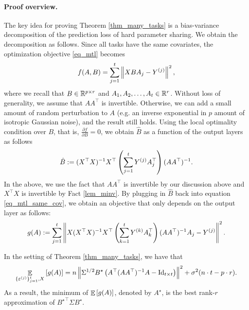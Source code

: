 	\paragraph{Proof overview.} The key idea for proving Theorem \ref{thm_many_tasks} is a bias-variance decomposition of the prediction loss of hard parameter sharing.
	We obtain the decomposition as follows.
	Since all tasks have the same covariates, the optimization objective \eqref{eq_mtl} becomes
	\begin{align}
		f(A, B) = \sum_{j=1}^t \left\| X B A_j - Y^{(j)} \right\|^2, \label{eq_mtl_same_cov}
	\end{align}
	where we recall that $B \in \mathbb{R}^{p \times r}$ and $A_1, A_2, \dots, A_t \in \mathbb{R}^r$. %
	Without loss of generality, we assume that $AA^{\top}$ is invertible.
	Otherwise, we can add a small amount of random perturbation to $A$ (e.g. an inverse exponential in $p$ amount of isotropic Gaussian noise), and the result still holds.
	Using the local optimality condition over $B$, that is, $\frac{\partial f}{\partial B} = 0$, we obtain $\hat{B}$ as a function of the output layers as follows
	\begin{align}
		\hat{B} \define (X^{\top}X)^{-1} X^{\top} \bigbrace{\sum_{j=1}^t Y^{(j)} A_j^{\top}} (A  A^{\top})^{-1}. \label{eq_Bhat} %
	\end{align}
	In the above, we use the fact that $AA^{\top}$ is invertible by our discussion above and $X^{\top}X$ is invertible by Fact \ref{lem_minv}.
	By plugging in $\hat{B}$ back into equation \eqref{eq_mtl_same_cov}, we obtain an objective that only depends on the output layer as follows:
	\begin{align}
		g(A) := \sum_{j=1}^t \left\| X (X^{\top}X)^{-1}X^{\top} \left({\sum_{k=1}^t Y^{(k)} A_{k}^{\top}}\right) (AA^{\top})^{-1} A_j - Y^{(j)} \right\|^2. \label{eq_mtl_output_layer}
	\end{align}

	\begin{claim}\label{lem_exp_opt}
		In the setting of Theorem \ref{thm_many_tasks}, we have that
		\begin{align}
			\mathop{\mathbb{E}}_{\{\varepsilon^{(j)}\}_{j=1}^t, X}\left[ g(A) \right] = n \left\| \Sigma^{1/2} B^{\star} \left({A^{\top} (AA^{\top})^{-1} A - \operatorname{Id}_{t\times t}}\right) \right\|^2 + \sigma^2 (n\cdot t - p \cdot r). \label{eq_gA}
		\end{align}
		As a result, the minimum of $\mathop{\mathbb{E}}\left[ g(A) \right]$, denoted by $A^{\star}$, is the best rank-$r$ approximation of ${B^{\star}}^{\top}\Sigma B^{\star}$.
	\end{claim}

